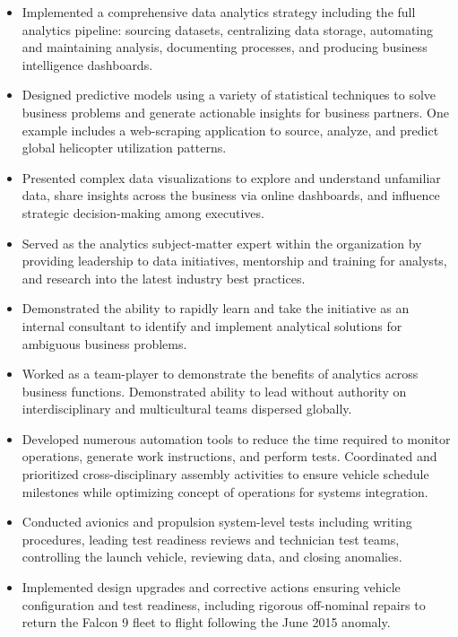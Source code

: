 \documentclass[11pt,letterpaper,sans]{moderncv} %
\begin{document}
\begin{itemize}
\item Implemented a comprehensive data analytics strategy including the full analytics pipeline: sourcing datasets, centralizing data storage, automating and maintaining analysis, documenting processes, and producing business intelligence dashboards.
\item Designed predictive models using a variety of statistical techniques to solve business problems and generate actionable insights for business partners. One example includes a web-scraping application to source, analyze, and predict global helicopter utilization patterns.
\item Presented complex data visualizations to explore and understand unfamiliar data, share insights across the business via online dashboards, and influence strategic decision-making among executives. 
\item Served as the analytics subject-matter expert within the organization by providing leadership to data initiatives, mentorship and training for analysts, and research into the latest industry best practices.
\item Demonstrated the ability to rapidly learn and take the initiative as an internal consultant to identify and implement analytical solutions for ambiguous business problems.
\item Worked as a team-player to demonstrate the benefits of analytics across business functions. Demonstrated ability to lead without authority on interdisciplinary and multicultural teams dispersed globally.
\end{itemize}
\vspace{6pt}


\begin{itemize}
\item Developed numerous automation tools to reduce the time required to monitor operations, generate work instructions, and perform tests. Coordinated and prioritized cross-disciplinary assembly activities to ensure vehicle schedule milestones while optimizing concept of operations for systems integration.
\item Conducted avionics and propulsion system-level tests including writing procedures, leading test readiness reviews and technician test teams, controlling the launch vehicle, reviewing data, and closing anomalies.
\item Implemented design upgrades and corrective actions ensuring vehicle configuration and test readiness, including rigorous off-nominal repairs to return the Falcon 9 fleet to flight following the June 2015 anomaly.
\end{itemize}
\vspace{6pt}
\end{document}

